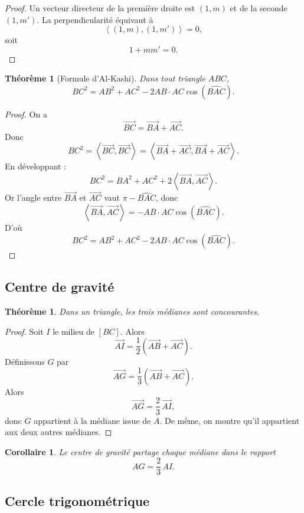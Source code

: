 \documentclass[11pt,a4paper]{article}
\newcommand{\ps}[2]{\left\langle #1,#2\right\rangle}
\theoremstyle{definition}
\theoremstyle{plain}
\newtheorem{theoreme}[definition]{Théorème}
\newtheorem{corollaire}[definition]{Corollaire}
\begin{document}
\begin{proof}
Un vecteur directeur de la première droite est $(1,m)$ et de la seconde $(1,m')$.
La perpendicularité équivaut à
\[
\ps{(1,m)}{(1,m')}=0,
\]
soit
\[
1+mm'=0.
\]
\end{proof}

\begin{theoreme}[Formule d'Al-Kashi]
Dans tout triangle $ABC$,
\[
BC^2=AB^2+AC^2-2AB\cdot AC\cos(\widehat{BAC}).
\]
\end{theoreme}

\begin{proof}
On a
\[
\overrightarrow{BC}=\overrightarrow{BA}+\overrightarrow{AC}.
\]
Donc
\[
BC^2=\ps{\overrightarrow{BC}}{\overrightarrow{BC}}
=\ps{\overrightarrow{BA}+\overrightarrow{AC}}{\overrightarrow{BA}+\overrightarrow{AC}}.
\]
En développant :
\[
BC^2=BA^2+AC^2+2\ps{\overrightarrow{BA}}{\overrightarrow{AC}}.
\]
Or l'angle entre $\overrightarrow{BA}$ et $\overrightarrow{AC}$ vaut $\pi-\widehat{BAC}$, donc
\[
\ps{\overrightarrow{BA}}{\overrightarrow{AC}}
=
-AB\cdot AC\cos(\widehat{BAC}).
\]
D'où
\[
BC^2=AB^2+AC^2-2AB\cdot AC\cos(\widehat{BAC}).
\]
\end{proof}

\subsection{Centre de gravité}

\begin{theoreme}
Dans un triangle, les trois médianes sont concourantes.
\end{theoreme}

\begin{proof}
Soit $I$ le milieu de $[BC]$.
Alors
\[
\overrightarrow{AI}=\frac12(\overrightarrow{AB}+\overrightarrow{AC}).
\]
Définissons $G$ par
\[
\overrightarrow{AG}=\frac13(\overrightarrow{AB}+\overrightarrow{AC}).
\]
Alors
\[
\overrightarrow{AG}=\frac23\,\overrightarrow{AI},
\]
donc $G$ appartient à la médiane issue de $A$.
De même, on montre qu'il appartient aux deux autres médianes.
\end{proof}

\begin{corollaire}
Le centre de gravité partage chaque médiane dans le rapport
\[
AG=\frac23\,AI.
\]
\end{corollaire}

\subsection{Cercle trigonométrique}
\end{document}
